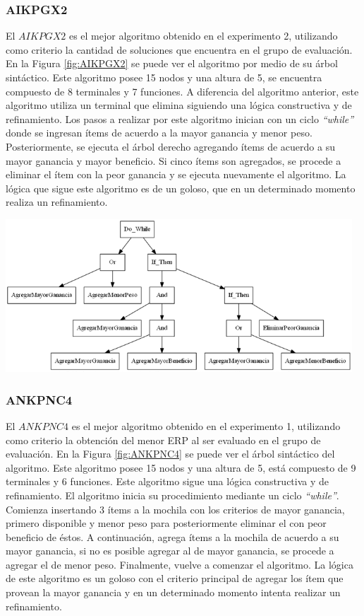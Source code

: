 \subsubsection{AIKPGX2}

El $AIKPGX2$ es el mejor algoritmo obtenido en el experimento 2, utilizando como criterio la cantidad de soluciones que encuentra en el grupo de evaluación. En la Figura \ref{fig:AIKPGX2} se puede ver el algoritmo por medio de su árbol sintáctico. Este algoritmo posee 15 nodos y una altura de 5, se encuentra compuesto de 8 terminales y 7 funciones. A diferencia del algoritmo anterior, este algoritmo utiliza un terminal que elimina siguiendo una lógica constructiva y de refinamiento.
Los pasos a realizar por este algoritmo inician con un ciclo \textit{“while”} donde se ingresan ítems de acuerdo a la mayor ganancia y menor peso. Posteriormente, se ejecuta el árbol derecho agregando ítems de acuerdo a su mayor ganancia y mayor beneficio. Si cinco ítems son agregados, se procede a eliminar el ítem con la peor ganancia y se ejecuta nuevamente el algoritmo. La lógica que sigue este algoritmo es de un goloso, que en un determinado momento realiza un refinamiento.

\begingroup
    \centering
    \includegraphics[width=13cm]{images/cap6/AIKPGX2.png}
    \label{fig:AIKPGX2}
\endgroup

\subsubsection{ANKPNC4}

El $ANKPNC4$ es el mejor algoritmo obtenido en el experimento 1, utilizando como criterio la obtención del menor ERP al ser evaluado en el grupo de evaluación. En la Figura \ref{fig:ANKPNC4} se puede ver el árbol sintáctico del algoritmo. Este algoritmo posee 15 nodos y una altura de 5, está compuesto de 9 terminales y 6 funciones. Este algoritmo sigue una lógica constructiva y de refinamiento.
El algoritmo inicia su procedimiento mediante un ciclo \textit{“while”}. Comienza insertando 3 ítems a la mochila con los criterios de mayor ganancia, primero disponible y menor peso para posteriormente eliminar el con peor beneficio de éstos. A continuación, agrega ítems a la mochila de acuerdo a su mayor ganancia, si no es posible agregar al de mayor ganancia, se procede a agregar el de menor peso. Finalmente, vuelve a comenzar el algoritmo. La lógica de este algoritmo es un goloso con el criterio principal de agregar los ítem que provean la mayor ganancia y en un determinado momento intenta realizar un refinamiento.

